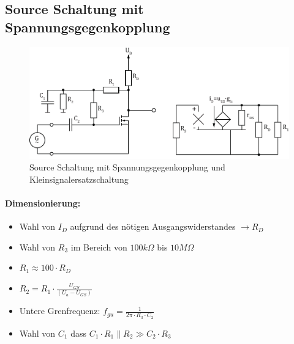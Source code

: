 



\subsection{Source Schaltung mit Spannungsgegenkopplung}
\begin{figure}[h!]
	\centering
	\includegraphics[width = \linewidth]{fet_source_u.pdf}
	\caption{Source Schaltung mit Spannungsgegenkopplung und Kleinsignalersatzschaltung}
	\label{fet:sourceschaltung_u}
\end{figure}
\noindent
\paragraph{Dimensionierung:}
\begin{itemize}
	\item Wahl von $I_D$ aufgrund des nötigen Ausgangswiderstandes $\rightarrow R_D$
	\item Wahl von $R_3$ im Bereich von $100k\Omega$ bis $10M\Omega$
	\item $R_1 \approx 100\cdot R_D$
	\item $R_2 = R_1 \cdot \frac{U_{GS}}{(U_a-U_{GS})}$
	\item Untere Grenfrequenz: $f_{gu} = \frac{1}{2\pi \cdot R_3 \cdot C_2}$
	\item Wahl von $C_1$ dass $C_1 \cdot R_1 \parallel R_2 \gg C_2 \cdot R_3$
\end{itemize}
